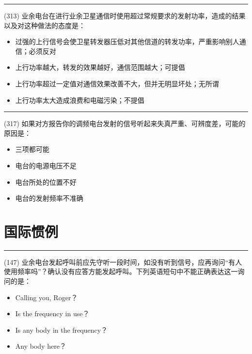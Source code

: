 \documentclass[twocolumn,hyperref,UTF8]{ctexart}  %
\begin{document}
\noindent\rule{0.5\textwidth}{1pt}
\heiti (313) 业余电台在进行业余卫星通信时使用超过常规要求的发射功率，造成的结果以及对这种做法的态度是： \songti {\color{gray} [LK0898] }
\begin{itemize}
	\item  过强的上行信号会使卫星转发器压低对其他信道的转发功率，严重影响别人通信；必须反对
	\item  上行功率越大，转发的效果越好，通信范围越大；可提倡
	\item  上行功率超过一定值对通信效果改善不大，但并无明显坏处；无所谓
	\item  上行功率太大造成浪费和电磁污染；不提倡
\end{itemize}


\noindent\rule{0.5\textwidth}{1pt}
\heiti (317) 如果对方报告你的调频电台发射的信号听起来失真严重、可辨度差，可能的原因是： \songti {\color{gray} [LK1182] }
\begin{itemize}
	\item  三项都可能
	\item  电台的电源电压不足
	\item  电台所处的位置不好
	\item  电台的发射频率不准确
\end{itemize}









\clearpage
\section{国际惯例}


\noindent\rule{0.5\textwidth}{1pt}
\heiti (147) 业余电台发起呼叫前应先守听一段时间，如没有听到信号，应再询问“有人使用频率吗”？确认没有应答方能发起呼叫。下列英语短句中不能正确表达这一询问的是： \songti {\color{gray} [LK0236] }
\begin{itemize}
	\item  Calling you, Roger？
	\item  Is the frequency in use？
	\item  Is any body in the frequency？
	\item  Any body here？
\end{itemize}
\end{document}
